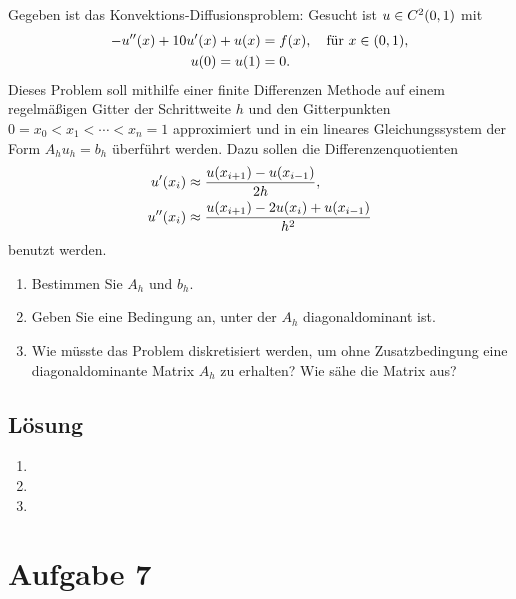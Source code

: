 \documentclass{exercise}
\begin{document}
    \begin{problem}
        Gegeben ist das Konvektions-Diffusionsproblem: Gesucht ist \(u \in C^2\parentheses*{0, 1}\) mit
        \begin{align*}
            -u''\parentheses*{x} + 10u'\parentheses*{x} + u\parentheses*{x} &= f\parentheses*{x}, \quad \text{für }x \in \parentheses*{0, 1},\\
            u\parentheses*{0} = u\parentheses*{1} &= 0.
        \end{align*}
        Dieses Problem soll mithilfe einer finite Differenzen Methode auf einem regelmäßigen Gitter der Schrittweite \(h\) und den Gitterpunkten \(0 = x_0 < x_1 < \cdots < x_n = 1\) approximiert und in ein lineares Gleichungssystem der Form \(A_h u_h = b_h\) überführt werden.
        Dazu sollen die Differenzenquotienten
        \begin{align*}
            u'\parentheses*{x_i} &\approx \frac{u\parentheses*{x_{i + 1}} - u\parentheses*{x_{i - 1}}}{2h},\\
            u''\parentheses*{x_i} &\approx \frac{u\parentheses*{x_{i + 1}} - 2u\parentheses*{x_i} + u\parentheses*{x_{i - 1}}}{h^2}
        \end{align*}
        benutzt werden.
        \begin{enumerate}
            \item Bestimmen Sie \(A_h\) und \(b_h\).
            \item Geben Sie eine Bedingung an, unter der \(A_h\) diagonaldominant ist.
            \item Wie müsste das Problem diskretisiert werden, um ohne Zusatzbedingung eine diagonaldominante Matrix \(A_h\) zu erhalten?
            Wie sähe die Matrix aus?
        \end{enumerate}
    \end{problem}

    \subsection*{Lösung}
    \begin{enumerate}
        \item
        \item
        \item
    \end{enumerate}


    \section*{Aufgabe 7}
\end{document}
